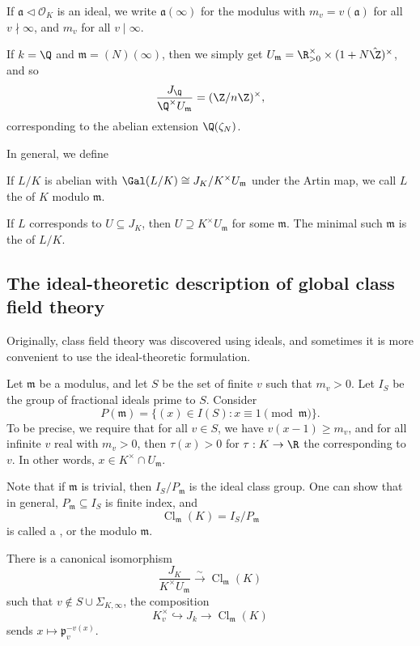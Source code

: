\documentclass[a4paper]{article}
\DeclareMathOperator\Cl{\mathrm{Cl}}
\begin{document}
If $\mathfrak{a} \lhd \mathcal{O}_K$ is an ideal, we write $\mathfrak{a}(\infty)$ for the modulus with $m_v = v(\mathfrak{a})$ for all $v \nmid \infty$, and $m_v$ for all $v \mid \infty$.

If $k = \Q$ and $\mathfrak{m} = (N)(\infty)$, then we simply get $U_\mathfrak{m} = \R_{>0}^\times \times (1 + N \hat{\Z})^\times$, and so
\[
  \frac{J_\Q}{\Q^\times U_\mathfrak{m}} = (\Z/n\Z)^\times,
\]
corresponding to the abelian extension $\Q(\zeta_N)$.

In general, we define
\begin{defi}
  If $L/K$ is abelian with $\Gal(L/K) \cong J_K/K^\times U_\mathfrak{m}$ under the Artin map, we call $L$ the  of $K$ modulo $\mathfrak{m}$.
\end{defi}

\begin{defi}[Conductor]
  If $L$ corresponds to $U \subseteq J_K$, then $U \supseteq K^\times U_\mathfrak{m}$ for some $\mathfrak{m}$. The minimal such $\mathfrak{m}$ is the  of $L/K$.
\end{defi}

\subsection{The ideal-theoretic description of global class field theory}
Originally, class field theory was discovered using ideals, and sometimes it is more convenient to use the ideal-theoretic formulation.

Let $\mathfrak{m}$ be a modulus, and let $S$ be the set of finite $v$ such that $m_v > 0$. Let $I_S$ be the group of fractional ideals prime to $S$. Consider
\[
  P(\mathfrak{m}) = \{(x) \in I(S): x \equiv 1 \pmod \mathfrak{m}\}.
\]
To be precise, we require that for all $v \in S$, we have $v(x - 1) \geq m_v$, and for all infinite $v$ real with $m_v > 0$, then $\tau(x) > 0$ for $\tau: K \to \R$ the corresponding to $v$. In other words, $x \in K^\times \cap U_\mathfrak{m}$.

Note that if $\mathfrak{m}$ is trivial, then $I_S/P_\mathfrak{m}$ is the ideal class group. One can show that in general, $P_\mathfrak{m} \subseteq I_S$ is finite index, and
\[
\Cl_\mathfrak{m}(K) = I_S/P_\mathfrak{m}
\]
is called a , or the  modulo $\mathfrak{m}$.

\begin{prop}
  There is a canonical isomorphism
  \[
    \frac{J_K}{K^\times U_\mathfrak{m}} \overset{\sim}{\to} \Cl_\mathfrak{m}(K)
  \]
  such that $v \not \in S\cup \Sigma_{K, \infty}$, the composition
  \[
    K_v^\times \hookrightarrow J_k \to \Cl_\mathfrak{m}(K)
  \]
  sends $x \mapsto \mathfrak{p}_v^{-v(x)}$.
\end{prop}
\end{document}
